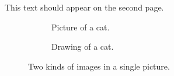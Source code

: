 \documentclass[11pt]{article}
\begin{document}
    \newpage
    This text should appear on the second page.

    \begin{figure}
        \centering
        \begin{subfigure}[b]{.5\textwidth}
            \centering
            \caption{Picture of a cat.}
            \label{fig:cat1}
        \end{subfigure}%
        \begin{subfigure}[b]{.5\textwidth}
            \centering
            \caption{Drawing of a cat.}
            \label{fig:cat2}
        \end{subfigure}
        \caption{Two kinds of images in a single picture.}
        \label{fig:cats}
    \end{figure}

\end{document}
